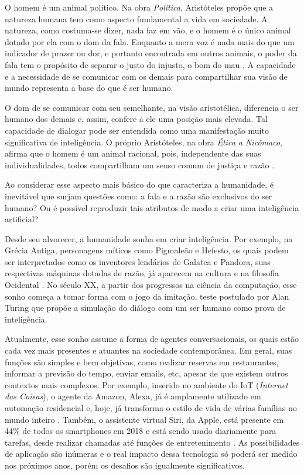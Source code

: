 \documentclass[]{politex}
\begin{document}
O homem é um animal político. Na obra \textit{Política}, Aristóteles propõe que a natureza humana tem como aspecto fundamental a vida em sociedade. A natureza, como costuma-se dizer, nada faz em vão, e o homem é o único animal dotado por ela com o dom da fala. Enquanto a mera voz é nada mais do que um indicador de prazer ou dor, e portanto encontrada em outros animais, o poder da fala tem o propósito de separar o justo do injusto, o bom do mau \cite{aristotlePolitcs1905}. A capacidade e a necessidade de se comunicar com os demais para compartilhar sua visão de mundo  representa a base do que é ser humano.

O dom de se comunicar com seu semelhante, na visão aristotélica, diferencia o ser humano dos demais e, assim, confere a ele uma posição mais elevada. Tal capacidade de dialogar pode ser entendida como uma manifestação muito significativa de inteligência. O próprio Aristóteles, na obra \textit{Ética a Nicômaco}, afirma que o homem é um animal racional, pois, independente das suas individualidades, todos compartilham um senso comum de justiça e razão \cite{aristotle_2000}. 

Ao considerar esse aspecto mais básico do que caracteriza a humanidade, é inevitável que surjam questões como: a fala e a razão são exclusivos do ser humano? Ou é possível reproduzir tais atributos de modo a criar uma inteligência artificial?

Desde seu alvorecer, a humanidade sonha em criar inteligência. Por exemplo, na Grécia Antiga, personagens míticos como Pigmaleão e Hefesto, os quais podem ser interpretados como os inventores lendários de Galatea e Pandora, suas respectivas máquinas dotadas de razão, já aparecem na cultura e na filosofia Ocidental  \cite{Goodfellow-et-al-2016}. No século XX, a partir dos progressos na ciência da computação, esse sonho começa a tomar forma com o jogo da imitação, teste postulado por Alan Turing que propõe a simulação do diálogo com um ser humano como prova de inteligência.

Atualmente, esse sonho assume a forma de agentes conversacionais, os quais estão cada vez mais presentes e atuantes na sociedade contemporânea. Em geral, suas funções são simples e bem objetivas, como realizar reservas em restaurantes, informar a previsão do tempo, enviar emails, etc, apesar de que existem outros contextos mais complexos. Por exemplo, inserido no ambiente do IoT (\textit{Internet das Coisas}), o agente da Amazon, Alexa, já é amplamente utilizado em automação residencial e, hoje, já transforma o estilo de vida de várias famílias no mundo inteiro \cite{Sciuto:2018:HAW:3196709.3196772}. Também, o assistente virtual Siri, da Apple, está presente em 44\% de todos os smartphones em 2018 e está sendo usado diariamente para tarefas, desde realizar chamadas até funções de entretenimento \cite{assistantStats}. As possibilidades de aplicação são inúmeras e o real impacto dessa tecnologia só poderá ser medido nos próximos anos, porém os desafios são igualmente significativos.
\end{document}
